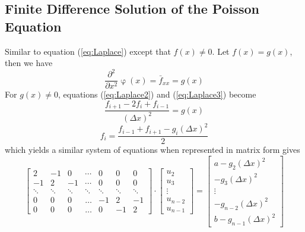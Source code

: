 \documentclass[../main.tex]{subfiles}
\begin{document}
\subsection{Finite Difference Solution of the Poisson Equation}
Similar to equation (\ref{eq:Laplace}) except that $f(x) \ne 0$. Let $f(x) = g(x)$, then we have
\begin{equation}
\frac{\partial^2}{\partial x^2}\upvarphi(x) = \bar{f}_{xx} = g(x)
\end{equation}
For $g(x) \ne 0$, equations (\ref{eq:Laplace2}) and (\ref{eq:Laplace3}) become
\begin{equation}
\frac{f_{i+1} - 2f_i + f_{i-1}}{(\Delta x)^2} = g(x)
\end{equation}
\begin{equation}
f_i = \frac{f_{i-1}+f_{i+1}-g_i(\Delta x)^2}{2}
\end{equation}
which yields a similar system of equations when represented in matrix form gives
\[
\begin{bmatrix}
    2		&	-1		&	0		&	\cdots	&0&	0		&	0\\
    -1		&	2		&	-1		&	\cdots	&0&	0		&	0\\
    \ddots	&	\ddots	&	\ddots	&	\ddots	&\ddots&	\ddots	&	\ddots\\
    0		&	0		&	0		&	\hdots	&-1&	2		&	-1\\
    0		&	0		&	0		&	\hdots	&0&	-1		&	2
\end{bmatrix}
\cdot
\begin{bmatrix}
    u_2\\u_3\\\vdots\\u_{n-2}\\u_{n-1}
\end{bmatrix}
=
\begin{bmatrix}
a-g_2(\Delta x)^2\\-g_3(\Delta x)^2\\\vdots\\-g_{n-2}(\Delta x)^2\\b-g_{n-1} (\Delta x)^2
\end{bmatrix}
\]

\end{document}

